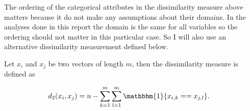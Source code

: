 \documentclass[result.tex]{subfiles}
\begin{document}
The ordering of the categorical attributes in the dissimilarity measure above matters because it do not make any assumptions about their domains. In the analyses done in this report the domain is the same for all variables so the ordering should not matter in this particular case. So I will also use an alternative dissimilarity measurement defined below.

Let $x_i$ and $x_j$ be two vectors of length $m$, then the dissimilarity measure is defined as

\begin{align*}
d_2(x_i, x_j) &= n - \sum_{k=1}^{m} \sum_{l=1}^{m} \mathbbm{1} \{ x_{i, k} == x_{j, l} \}.
\end{align*}
\end{document}
